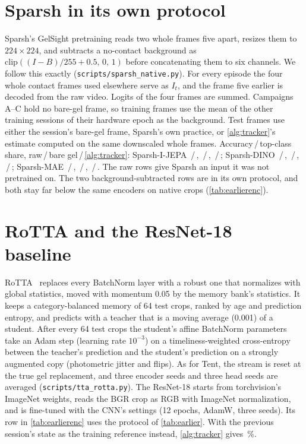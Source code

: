 \documentclass[10pt,twocolumn,letterpaper]{article}
\newcommand{\pct}{\,\%}
\newcommand{\af}[2]{#1\,/\,#2}
\begin{document}
\section{Sparsh in its own protocol}
\label{sec:sparshown}
Sparsh's GelSight pretraining reads two whole frames five apart, resizes them to $224\times224$, and subtracts a no-contact background as $\mathrm{clip}((I-B)/255+0.5,\,0,\,1)$ before concatenating them to six channels. We follow this exactly (\texttt{scripts/sparsh\_native.py}). For every episode the four whole contact frames used elsewhere serve as $I_t$, and the frame five earlier is decoded from the raw video. Logits of the four frames are summed. Campaigns A--C hold no bare-gel frame, so training frames use the mean of the other training sessions of their hardware epoch as the background. Test frames use either the session's bare-gel frame, Sparsh's own practice, or \cref{alg:tracker}'s estimate computed on the same downscaled whole frames. Accuracy\,/\,top-class share, raw\,/\,bare gel\,/\,\cref{alg:tracker}: Sparsh-I-JEPA \af{\SnIjepaRawAcc}{\SnIjepaRawTop}, \af{\SnIjepaBlankAcc}{\SnIjepaBlankTop}, \af{\SnIjepaStateAcc}{\SnIjepaStateTop}; Sparsh-DINO \af{\SnSdinoRawAcc}{\SnSdinoRawTop}, \af{\SnSdinoBlankAcc}{\SnSdinoBlankTop}, \af{\SnSdinoStateAcc}{\SnSdinoStateTop}; Sparsh-MAE \af{\SnMaeRawAcc}{\SnMaeRawTop}, \af{\SnMaeBlankAcc}{\SnMaeBlankTop}, \af{\SnMaeStateAcc}{\SnMaeStateTop}. The raw rows give Sparsh an input it was not pretrained on. The two background-subtracted rows are in its own protocol, and both stay far below the same encoders on native crops (\cref{tab:earlierenc}).

\section{RoTTA and the ResNet-18 baseline}
\label{sec:rotta}
RoTTA~\cite{yuan2023rotta} replaces every BatchNorm layer with a robust one that normalizes with global statistics, moved with momentum 0.05 by the memory bank's statistics. It keeps a category-balanced memory of 64 test crops, ranked by age and prediction entropy, and predicts with a teacher that is a moving average (0.001) of a student. After every 64 test crops the student's affine BatchNorm parameters take an Adam step (learning rate $10^{-3}$) on a timeliness-weighted cross-entropy between the teacher's prediction and the student's prediction on a strongly augmented copy (photometric jitter and flips). As for Tent, the stream is reset at the true gel replacement, and three encoder seeds and three head seeds are averaged (\texttt{scripts/tta\_rotta.py}). The ResNet-18 starts from torchvision's ImageNet weights, reads the BGR crop as RGB with ImageNet normalization, and is fine-tuned with the CNN's settings (12 epochs, AdamW, three seeds). Its row in \cref{tab:earlierenc} uses the protocol of \cref{tab:earlier}. With the previous session's state as the training reference instead, \cref{alg:tracker} gives \FoDResTrkPrevAcc\pct.
\end{document}
